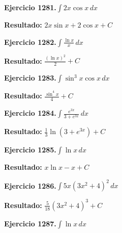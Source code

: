\documentclass[10pt,a4paper]{article}
\begin{document}
\begin{ejbox}
\textbf{Ejercicio 1281.}\quad $\int 2x \cos x\,dx$
\end{ejbox}

\begin{solbox}
\textbf{Resultado:} \(\displaystyle 2x\sin x + 2\cos x + C\)
\end{solbox}

\newpage
\begin{ejbox}
\textbf{Ejercicio 1282.}\quad $\int \frac{\ln x}{x}\,dx$
\end{ejbox}

\begin{solbox}
\textbf{Resultado:} \(\displaystyle \frac{(\ln x)^2}{2} + C\)
\end{solbox}

\begin{ejbox}
\textbf{Ejercicio 1283.}\quad $\int \sin^{3}x \cos x\,dx$
\end{ejbox}

\begin{solbox}
\textbf{Resultado:} \(\displaystyle \frac{\sin^{4}x}{4} + C\)
\end{solbox}

\begin{ejbox}
\textbf{Ejercicio 1284.}\quad $\int \frac{e^{3x}}{3+e^{3x}}\,dx$
\end{ejbox}

\begin{solbox}
\textbf{Resultado:} \(\displaystyle \frac{1}{3}\ln(3+e^{3x}) + C\)
\end{solbox}

\newpage
\begin{ejbox}
\textbf{Ejercicio 1285.}\quad $\int \ln x\,dx$
\end{ejbox}

\begin{solbox}
\textbf{Resultado:} \(\displaystyle x\ln x - x + C\)
\end{solbox}

\begin{ejbox}
\textbf{Ejercicio 1286.}\quad $\int 5x(3x^2 + 4)^{2}\,dx$
\end{ejbox}

\begin{solbox}
\textbf{Resultado:} \(\displaystyle \frac{5}{18}(3x^2+4)^{3} + C\)
\end{solbox}

\begin{ejbox}
\textbf{Ejercicio 1287.}\quad $\int \ln x\,dx$
\end{ejbox}
\end{document}
